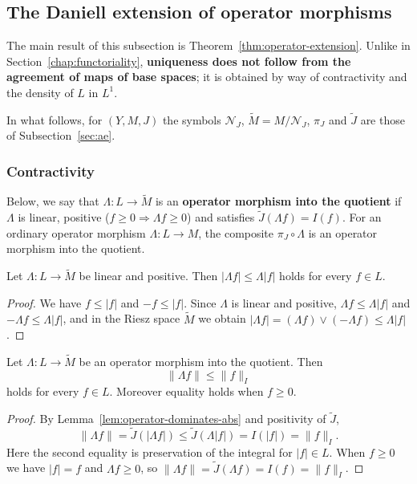 \subsection{The Daniell extension of operator morphisms}

The main result of this subsection is
Theorem~\ref{thm:operator-extension}.
Unlike in Section~\ref{chap:functoriality},
\textbf{uniqueness does not follow from the agreement of maps of base spaces};
it is obtained by way of contractivity and the density of $L$ in $L^1$.

In what follows, for $(Y,M,J)$ the symbols $\mathcal{N}_J$,
$\widetilde{M}=M/\mathcal{N}_J$, $\pi_J$ and $\widetilde{J}$ are those of
Subsection~\ref{sec:ae}.

\subsubsection{Contractivity}

Below, we say that $\Lambda:L\to\widetilde{M}$ is an \textbf{operator morphism
into the quotient} if $\Lambda$ is linear, positive
($f\ge0\Rightarrow\Lambda f\ge0$) and satisfies
$\widetilde{J}(\Lambda f)=I(f)$.
For an ordinary operator morphism $\Lambda:L\to M$, the composite
$\pi_J\circ\Lambda$ is an operator morphism into the quotient.

\begin{lemma}\label{lem:operator-dominates-abs}
  Let $\Lambda:L\to\widetilde{M}$ be linear and positive.
  Then $|\Lambda f|\le\Lambda|f|$ holds for every $f\in L$.
\end{lemma}
\begin{proof}
  We have $f\le|f|$ and $-f\le|f|$. Since $\Lambda$ is linear and positive,
  $\Lambda f\le\Lambda|f|$ and $-\Lambda f\le\Lambda|f|$, and in the Riesz space
  $\widetilde{M}$ we obtain
  $|\Lambda f|=(\Lambda f)\vee(-\Lambda f)\le\Lambda|f|$.
\end{proof}

\begin{lemma}[contractivity]\label{lem:operator-is-contraction}
  Let $\Lambda:L\to\widetilde{M}$ be an operator morphism into the quotient.
  Then
  \[
    \|\Lambda f\|\le\|f\|_I
  \]
  holds for every $f\in L$. Moreover equality holds when $f\ge0$.
\end{lemma}
\begin{proof}
  By Lemma~\ref{lem:operator-dominates-abs} and positivity of $\widetilde{J}$,
  \[
    \|\Lambda f\|=\widetilde{J}(|\Lambda f|)\le\widetilde{J}(\Lambda|f|)=I(|f|)=\|f\|_I.
  \]
  Here the second equality is preservation of the integral for $|f|\in L$.
  When $f\ge0$ we have $|f|=f$ and $\Lambda f\ge0$, so
  $\|\Lambda f\|=\widetilde{J}(\Lambda f)=I(f)=\|f\|_I$.
\end{proof}

